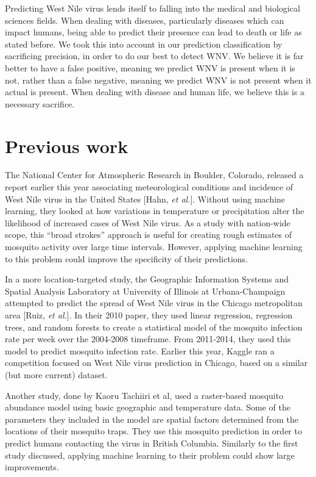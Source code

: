 \documentclass{article} %
\begin{document}
Predicting West Nile virus lends itself to falling into the medical and biological sciences fields.  When dealing with diseases, particularly diseases which can impact humans, being able to predict their presence can lead to death or life as stated before.  We took this into account in our prediction classification by sacrificing precision, in order to do our best to detect WNV.  We believe it is far better to have a false positive, meaning we predict WNV is present when it is not, rather than a false negative, meaning we predict WNV is not present when it actual is present.  When dealing with disease and human life, we believe this is a necessary sacrifice.

\section{Previous work}
The National Center for Atmospheric Research in Boulder, Colorado, released a report earlier this year associating meteorological conditions and incidence of West Nile virus in the United States [Hahn, \textit{et al.}].  Without using machine learning, they looked at how variations in temperature or precipitation alter the likelihood of increased cases of West Nile virus.    As a study with nation-wide scope, this ``broad strokes'' approach is useful for creating rough estimates of mosquito activity over large time intervals.  However, applying machine learning to this problem could improve the specificity of their predictions.

In a more location-targeted study, the Geographic Information Systems and Spatial Analysis Laboratory at University of Illinois at Urbana-Champaign attempted to predict the spread of West Nile virus in the Chicago metropolitan area [Ruiz, \textit{et al.}].  In their 2010 paper, they used linear regression, regression trees, and random forests to create a statistical model of the mosquito infection rate per week over the 2004-2008 timeframe.  From 2011-2014, they used this model to predict mosquito infection rate.  Earlier this year, Kaggle ran a competition focused on West Nile virus prediction in Chicago, based on a similar (but more current) dataset.  

Another study, done by Kaoru Tachiiri et al, used a raster-based mosquito abundance model using basic geographic and temperature data. Some of the parameters they included in the model are spatial factors determined from the locations of their mosquito traps.  They use this mosquito prediction in order to predict humans contacting the virus in British Columbia.  Similarly to the first study discussed, applying machine learning to their problem could show large improvements.  
\end{document}
